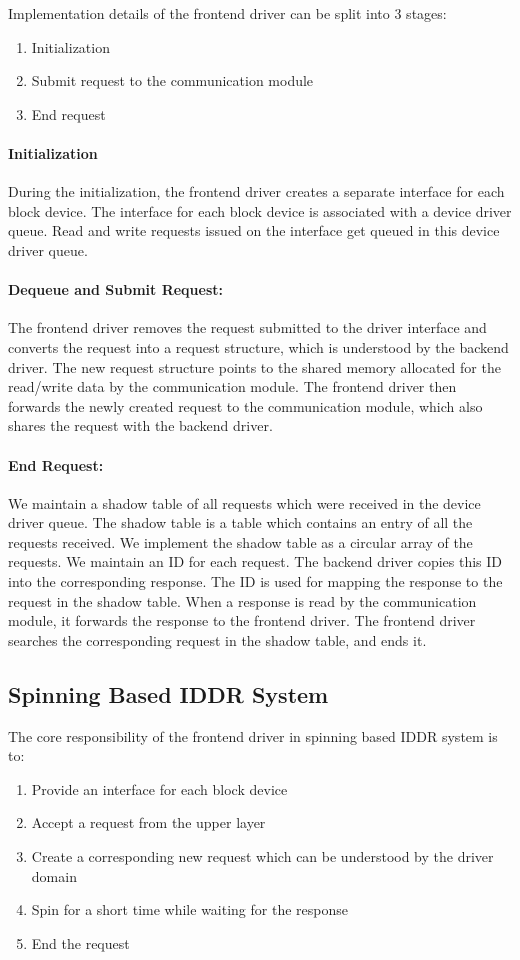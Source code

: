 Implementation details of the frontend driver can be split into 3 stages: 
\begin{enumerate}
\item Initialization
\item Submit request to the communication module
\item End request
\end{enumerate}

\paragraph{Initialization}
During the initialization, the frontend driver creates a separate
interface for each block device. The interface for each block device is
associated with a device driver queue. Read and write requests issued
on the interface get queued in this device driver queue.

\paragraph{Dequeue and Submit Request:}
The frontend driver removes the request submitted to the driver
interface and converts the request into a request structure, which is
understood by the backend driver. The new request structure points to
the shared memory allocated for the read/write data by the communication
module. The frontend driver then forwards the newly created request
to the communication module, which also shares the request with the
backend driver.

\paragraph{End Request:}
We maintain a shadow table of all requests which were received in the
device driver queue. The shadow table is a table which contains an entry
of all the requests received. We implement the shadow table as a circular
array of the requests. We maintain an ID for each request. The backend
driver copies this ID into the corresponding response. The ID is used
for mapping the response to the request in the shadow table. When a
response is read by the communication module, it forwards the response
to the frontend driver. The frontend driver searches the corresponding
request in the shadow table, and ends it.

\subsection*{Spinning Based IDDR System}
The core responsibility of the frontend driver in spinning based IDDR system is to:
\begin{enumerate}
\item Provide an interface for each block device
\item Accept a request from the upper layer
\item Create a corresponding new request which can be understood by the driver domain
\item Spin for a short time while waiting for the response
\item End the request
\end{enumerate}

